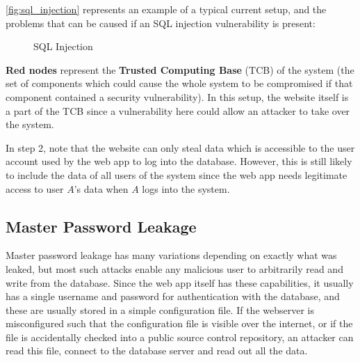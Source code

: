 \documentclass[12pt]{report}
\begin{document}
\autoref{fig:sql_injection} represents an example of a typical current setup, and the problems that can be caused if an SQL injection vulnerability is present:

\begin{figure}[ht]
  \begin{center}
  \end{center}
  \caption{SQL Injection}
  \label{fig:sql_injection}
\end{figure}

\textbf{Red nodes} represent the \textbf{Trusted Computing Base} (TCB) of the system (the set of components which could cause the whole system to be compromised if that component contained a security vulnerability). In this setup, the website itself is a part of the TCB since a vulnerability here could allow an attacker to take over the system.

In step 2, note that the website can only steal data which is accessible to the user account used by the web app to log into the database. However, this is still likely to include the data of all users of the system since the web app needs legitimate access to user $A$'s data when $A$ logs into the system.

\subsection{Master Password Leakage}
Master password leakage has many variations depending on exactly what was leaked, but most such attacks enable any malicious user to arbitrarily read and write from the database. Since the web app itself has these capabilities, it usually has a single username and password for authentication with the database, and these are usually stored in a simple configuration file. If the webserver is misconfigured such that the configuration file is visible over the internet, or if the file is accidentally checked into a public source control repository, an attacker can read this file, connect to the database server and read out all the data.
\end{document}
